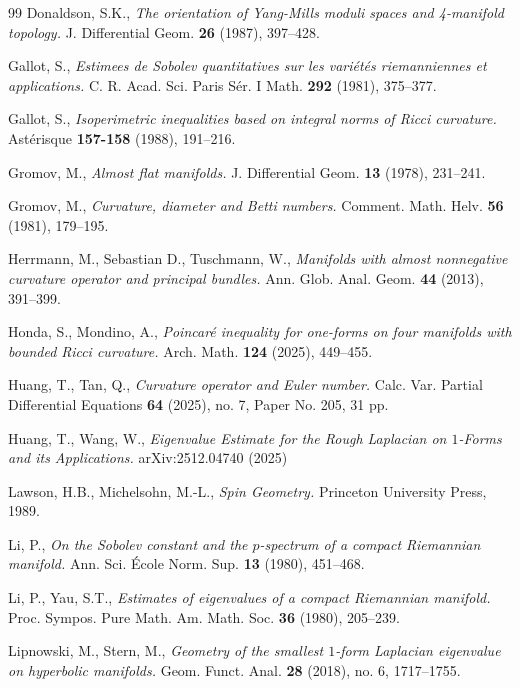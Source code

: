 \documentclass[12pt, twoside]{article}
\theoremstyle{definition}
\numberwithin{equation}{section}
\begin{document}
\begin{thebibliography}{99}
		Donaldson, S.K., \emph{The orientation of Yang-Mills moduli spaces and 4-manifold topology.} J. Differential Geom. \textbf{26} (1987), 397--428.
		

		
		Gallot, S., \emph{Estimees de Sobolev quantitatives sur les variétés riemanniennes et applications.} C. R. Acad. Sci. Paris Sér. I Math. \textbf{292} (1981), 375--377.
		
		Gallot, S., \emph{Isoperimetric inequalities based on integral norms of Ricci curvature.} Astérisque \textbf{157-158} (1988), 191--216.
		
		Gromov, M., \emph{Almost flat manifolds.} J. Differential Geom. \textbf{13} (1978), 231--241.
		
		Gromov, M., \emph{Curvature, diameter and Betti numbers.} Comment. Math. Helv. \textbf{56} (1981), 179--195.
		
		Herrmann, M., Sebastian D., Tuschmann, W., \emph{Manifolds with almost nonnegative curvature operator and principal bundles.} Ann. Glob. Anal. Geom. \textbf{44} (2013), 391--399.
		
		Honda, S., Mondino, A.,
		 \emph{Poincaré inequality for one-forms on four manifolds with bounded Ricci curvature.}
		 Arch. Math. \textbf{124} (2025), 449--455.
		
		Huang, T., Tan, Q., \emph{Curvature operator and Euler number.} Calc. Var. Partial Differential Equations \textbf{64} (2025), no. 7, Paper No. 205, 31 pp.
		
		Huang, T., Wang, W., \emph{Eigenvalue Estimate for the Rough Laplacian on $1$-Forms and its Applications.} arXiv:2512.04740 (2025)
	
				
		Lawson, H.B., Michelsohn, M.-L.,  \emph{Spin Geometry.} Princeton University Press, 1989.
		
		Li, P., \emph{On the Sobolev constant and the $p$-spectrum of a compact Riemannian manifold.} Ann. Sci. École Norm. Sup. \textbf{13} (1980), 451--468.
		
		Li, P., Yau, S.T.,
		\emph{Estimates of eigenvalues of a compact Riemannian manifold.} Proc. Sympos. Pure Math. Am. Math. Soc. \textbf{36} (1980), 205--239.
		
		Lipnowski, M., Stern, M.,
		\emph{Geometry of the smallest $1$-form Laplacian eigenvalue on hyperbolic manifolds.}
		Geom. Funct. Anal. \textbf{28} (2018), no. 6, 1717--1755. 
		

\end{thebibliography}
\end{document}
